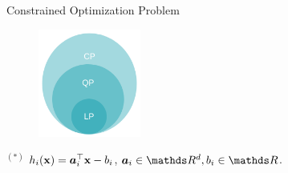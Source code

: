 \begin{vbframe}{Constrained Optimization Problem }
\vspace*{-0.3cm}
\begin{figure}{}
\includegraphics[width=0.3\textwidth]{figure_man/classes_optimization_problems.png}
\end{figure}

\begin{footnotesize}
$^{(*)}$ $h_i(\mathbf{x}) = \bm{a}_i^\top \mathbf{x} - b_i$, $\bm{a}_i \in \R^d, b_i \in \R$.
\end{footnotesize}






\end{vbframe}

